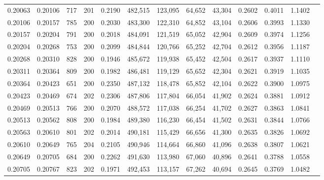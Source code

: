 \begin{tabular}{rrrrrrrrrrrrr}
0.20063 & 0.20106 &   717 & 201 &                                     0.2190 & 482,515 & 123,095 &  64,652 &  43,304 & 0.2602 & 0.4011 & 1.1402 \\
0.20106 & 0.20157 &   785 & 200 &                                     0.2030 & 483,300 & 122,310 &  64,852 &  43,104 & 0.2606 & 0.3993 & 1.1330 \\
0.20157 & 0.20204 &   791 & 200 &                                     0.2018 & 484,091 & 121,519 &  65,052 &  42,904 & 0.2609 & 0.3974 & 1.1256 \\
0.20204 & 0.20268 &   753 & 200 &                                     0.2099 & 484,844 & 120,766 &  65,252 &  42,704 & 0.2612 & 0.3956 & 1.1187 \\
0.20268 & 0.20310 &   828 & 200 &                                     0.1946 & 485,672 & 119,938 &  65,452 &  42,504 & 0.2617 & 0.3937 & 1.1110 \\
0.20311 & 0.20364 &   809 & 200 &                                     0.1982 & 486,481 & 119,129 &  65,652 &  42,304 & 0.2621 & 0.3919 & 1.1035 \\
0.20364 & 0.20423 &   651 & 200 &                                     0.2350 & 487,132 & 118,478 &  65,852 &  42,104 & 0.2622 & 0.3900 & 1.0975 \\
0.20423 & 0.20469 &   674 & 202 &                                     0.2306 & 487,806 & 117,804 &  66,054 &  41,902 & 0.2624 & 0.3881 & 1.0912 \\
0.20469 & 0.20513 &   766 & 200 &                                     0.2070 & 488,572 & 117,038 &  66,254 &  41,702 & 0.2627 & 0.3863 & 1.0841 \\
0.20513 & 0.20562 &   808 & 200 &                                     0.1984 & 489,380 & 116,230 &  66,454 &  41,502 & 0.2631 & 0.3844 & 1.0766 \\
0.20563 & 0.20610 &   801 & 202 &                                     0.2014 & 490,181 & 115,429 &  66,656 &  41,300 & 0.2635 & 0.3826 & 1.0692 \\
0.20610 & 0.20649 &   765 & 204 &                                     0.2105 & 490,946 & 114,664 &  66,860 &  41,096 & 0.2638 & 0.3807 & 1.0621 \\
0.20649 & 0.20705 &   684 & 200 &                                     0.2262 & 491,630 & 113,980 &  67,060 &  40,896 & 0.2641 & 0.3788 & 1.0558 \\
0.20705 & 0.20767 &   823 & 202 &                                     0.1971 & 492,453 & 113,157 &  67,262 &  40,694 & 0.2645 & 0.3769 & 1.0482 \\

\end{tabular}
